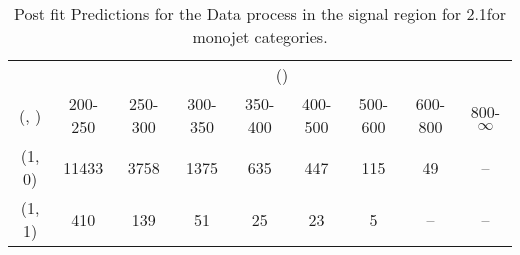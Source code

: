 \begin{table}[h!]
\tiny
\centering
\caption{Post fit Predictions for the Data process in the signal region for 2.1\ifb for monojet categories.\label{tab:predseppost_sig_data_mono}}
\begin{tabular}
{ccccccccc}
	\hline\hline
	& \multicolumn{8}{c}{\scalht (\gev)} \\ 
	 (\njet,  \nb) & 200-250 & 250-300 & 300-350 & 350-400 & 400-500 & 500-600 & 600-800 & 800-$\infty$ \\ [0.8ex] 
\hline
	(1, 0) & 11433 & 3758 & 1375 & 635 & 447 & 115 & 49 & -- \\[0.5ex] 
	(1, 1) & 410 & 139 & 51 & 25 & 23 & 5 & -- & -- \\[0.5ex] 
	\hline
	\hline
\end{tabular}
\end{table}
